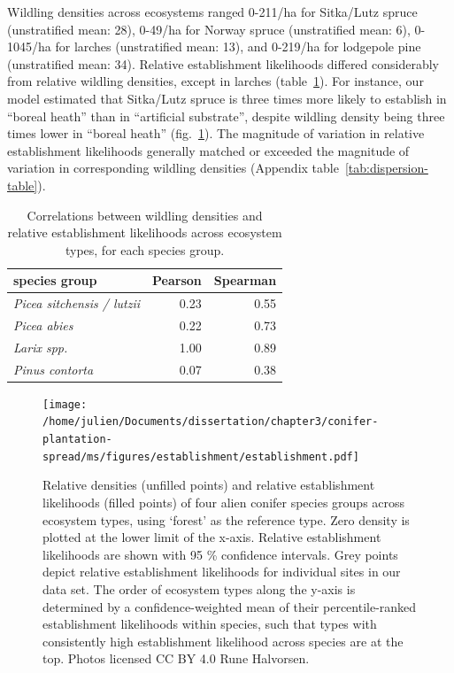 \documentclass[
]{article}
\begin{document}
Wildling densities across ecosystems ranged 0-211/ha for Sitka/Lutz spruce (unstratified mean: 28), 0-49/ha for Norway spruce (unstratified mean: 6), 0-1045/ha for larches (unstratified mean: 13), and 0-219/ha for lodgepole pine (unstratified mean: 34).
Relative establishment likelihoods differed considerably from relative wildling densities, except in larches (table~\ref{tab:estimate-correlation-table}).
For instance, our model estimated that Sitka/Lutz spruce is three times more likely to establish in ``boreal heath'' than in ``artificial substrate'', despite wildling density being three times lower in ``boreal heath'' (fig.~\ref{fig:establishment}).
The magnitude of variation in relative establishment likelihoods generally matched or exceeded the magnitude of variation in corresponding wildling densities (Appendix table~\ref{tab:dispersion-table}).

\begin{table}

\caption{\label{tab:estimate-correlation-table}Correlations between wildling densities and relative establishment likelihoods across ecosystem types, for each species group.}
\centering
\begin{tabular}[t]{>{}lrr}
\toprule
species group & Pearson & Spearman\\
\midrule
\em{Picea sitchensis / lutzii} & 0.23 & 0.55\\
\em{Picea abies} & 0.22 & 0.73\\
\em{Larix spp.} & 1.00 & 0.89\\
\em{Pinus contorta} & 0.07 & 0.38\\
\bottomrule
\end{tabular}
\end{table}

\newpage
\begin{landscape}

\begin{figure}
\centering
\texttt{[image: /home/julien/Documents/dissertation/chapter3/conifer-plantation-spread/ms/figures/establishment/establishment.pdf]}
\caption{\label{fig:establishment}Relative densities (unfilled points) and relative establishment likelihoods (filled points) of four alien conifer species groups across ecosystem types, using `forest' as the reference type. Zero density is plotted at the lower limit of the x-axis. Relative establishment likelihoods are shown with 95 \% confidence intervals. Grey points depict relative establishment likelihoods for individual sites in our data set. The order of ecosystem types along the y-axis is determined by a confidence-weighted mean of their percentile-ranked establishment likelihoods within species, such that types with consistently high establishment likelihood across species are at the top. Photos licensed CC BY 4.0 Rune Halvorsen.}
\end{figure}

\end{landscape}
\newpage
\end{document}

